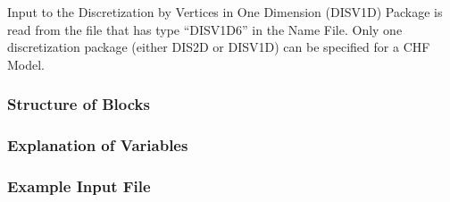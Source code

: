 Input to the Discretization by Vertices in One Dimension (DISV1D) Package is read from the file that has type ``DISV1D6'' in the Name File.  Only one discretization package (either DIS2D or DISV1D) can be specified for a CHF Model.

\vspace{5mm}
\subsubsection{Structure of Blocks}






\vspace{5mm}
\subsubsection{Explanation of Variables}
\begin{description}

\end{description}

\vspace{5mm}
\subsubsection{Example Input File}

